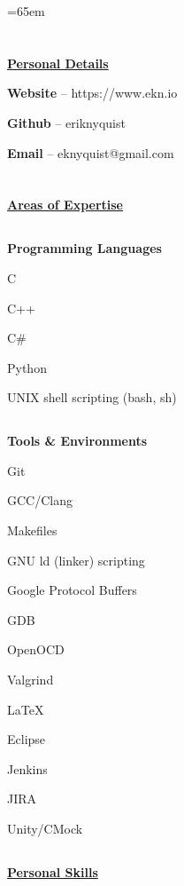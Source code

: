 \documentclass[6pt]{article}
\begin{document}
%
%
\hspace*{-\parindent}%
\begin{minipage}{15em}
\vspace*{-4.5em}%
\textheight=65em
\section*{}
{\underline{\textbf{Personal Details}}}
\break

{\small {\bfseries Website} -- https://www.ekn.io

{\bfseries Github} -- eriknyquist

{\bfseries Email} -- eknyquist@gmail.com}

\section*{}
{\underline{\textbf{Areas of Expertise}}}
\subsection*{}
{\textbf{Programming Languages}}

{\small C

C++

C\#

Python

UNIX shell scripting (bash, sh)}

\subsection*{}
{\textbf{Tools \& Environments}}

{\small Git

GCC/Clang

Makefiles

GNU ld (linker) scripting

Google Protocol Buffers

GDB

OpenOCD

Valgrind

{\LaTeX}

Eclipse

Jenkins

JIRA

Unity/CMock}

\subsection*{}
{\underline{\textbf{Personal Skills}}}


\end{minipage}
\end{document}
